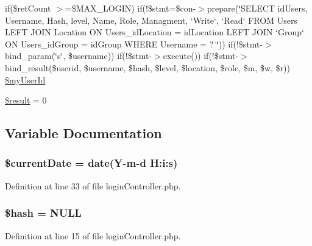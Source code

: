 \begin{DoxyCompactItemize}
if(\$ret\+Count $>$=\$M\+A\+X\+\_\+\+L\+O\+G\+IN) if(!\$stmt=\$con-\/$>$prepare(\char`\"{}S\+E\+L\+E\+CT id\+Users, Username, Hash, level, Name, Role, Managment, `Write`, `Read` F\+R\+OM Users L\+E\+FT J\+O\+IN Location ON Users\+\_\+id\+Location = id\+Location L\+E\+FT J\+O\+IN `Group` ON Users\+\_\+id\+Group = id\+Group W\+H\+E\+RE Username = ? \char`\"{})) if(!\$stmt-\/$>$bind\+\_\+param(\char`\"{}s\char`\"{}, \$username)) if(!\$stmt-\/$>$execute()) if(!\$stmt-\/$>$bind\+\_\+result(\$userid, \$username, \$hash, \$level, \$location, \$role, \$m, \$w, \$r)) \hyperlink{login_controller_8php_a67c41f5902e42a545f6ac644c135b3a7}{\$my\+User\+Id}
\item 
\hyperlink{login_controller_8php_a112ef069ddc0454086e3d1e6d8d55d07}{\$result} = 0
\end{DoxyCompactItemize}


\subsection{Variable Documentation}
\subsubsection[{\texorpdfstring{\$current\+Date}{$currentDate}}]{\setlength{\rightskip}{0pt plus 5cm}\$current\+Date = date(\textquotesingle{}Y-\/m-\/d H\+:i\+:s\textquotesingle{})}\hypertarget{login_controller_8php_a71b0d4434a284e136badb5b9a37f38bb}{}\label{login_controller_8php_a71b0d4434a284e136badb5b9a37f38bb}


Definition at line 33 of file login\+Controller.\+php.

\subsubsection[{\texorpdfstring{\$hash}{$hash}}]{\setlength{\rightskip}{0pt plus 5cm}\$hash = N\+U\+LL}\hypertarget{login_controller_8php_ac9fdf6f2c8fb45c1d3bb9a176802b2ad}{}\label{login_controller_8php_ac9fdf6f2c8fb45c1d3bb9a176802b2ad}


Definition at line 15 of file login\+Controller.\+php.

